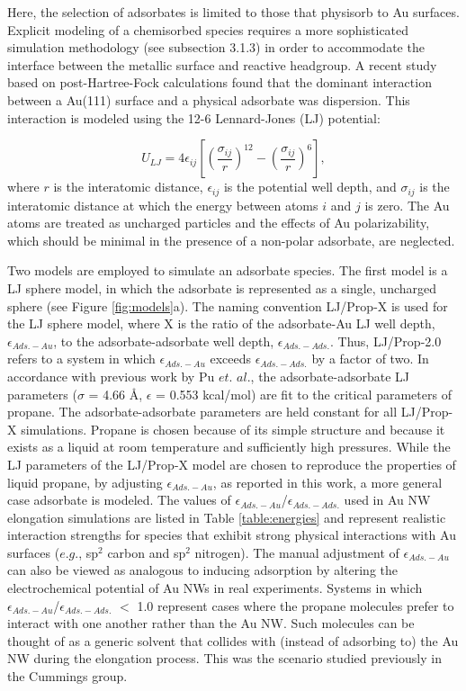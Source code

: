 \documentclass[10pt]{report}  %
\begin{document}
Here, the selection of adsorbates is limited to those that physisorb to Au surfaces.  Explicit modeling of a chemisorbed species requires a more sophisticated simulation methodology \cite{Pu:2010} (see subsection 3.1.3)  in order to accommodate the interface between the metallic surface and reactive headgroup.  A recent study based on post-Hartree-Fock calculations found that the dominant interaction between a Au(111) surface and a physical adsorbate was dispersion.\cite{Piana:2006}  This interaction is modeled using the 12-6 Lennard-Jones (LJ)  potential:  

\begin{equation}U_{LJ} = 4\epsilon_{ij}\left[\left(\frac{\sigma_{ij}}{r}\right)^{12}-\left(\frac{\sigma_{ij}}{r}\right)^{6}\right],\label{ULJ}
\end{equation} where $r$ is the interatomic distance, $\epsilon_{ij}$ is the potential well depth, and $\sigma_{ij}$ is the interatomic distance at which the energy between atoms $i$ and $j$ is zero.  The Au atoms are treated as uncharged particles and the effects of Au polarizability, which should be minimal in the presence of a non-polar adsorbate, are neglected. 

Two models are employed to simulate an adsorbate species.  The first model is a LJ sphere model, in which the adsorbate is represented as a single, uncharged sphere (see Figure \ref{fig:models}a).  The naming convention LJ/Prop-X is used for the LJ sphere model, where X is the ratio of the adsorbate-Au LJ well depth, $\epsilon_{Ads.-Au}$,  to the adsorbate-adsorbate well depth, $\epsilon_{Ads.-Ads.}$.  Thus, LJ/Prop-2.0 refers to a system in which $\epsilon_{Ads.-Au}$ exceeds $\epsilon_{Ads.-Ads.}$ by a factor of two. In accordance with previous work by Pu $et.$ $al.$,\cite{Pu:2007} the adsorbate-adsorbate LJ parameters ($\sigma$ = 4.66 \AA, $\epsilon$ = 0.553 kcal/mol) are fit to the critical parameters of propane.  The adsorbate-adsorbate parameters are held constant for all LJ/Prop-X simulations.  Propane is chosen because of its simple structure and because it exists as a liquid at room temperature and sufficiently high pressures. While the LJ parameters of the LJ/Prop-X model are chosen to reproduce the properties of liquid propane, by adjusting $\epsilon_{Ads.-Au}$, as reported in this work, a more general case adsorbate is modeled. The values of $\epsilon_{Ads.-Au}$/$\epsilon_{Ads.-Ads.}$ used in Au NW elongation simulations are listed in Table \ref{table:energies} and represent realistic interaction strengths for species that exhibit strong physical interactions with Au surfaces ($e.g.$, sp$^2$ carbon and sp$^2$ nitrogen).  The manual adjustment of $\epsilon_{Ads.-Au}$ can also be viewed as analogous to inducing adsorption by altering the electrochemical potential of Au NWs in real experiments. \cite{He:2002}  Systems in which $\epsilon_{Ads.-Au}$/$\epsilon_{Ads.-Ads.}$ $<$ 1.0 represent cases where the propane molecules prefer to interact with one another rather than the Au NW.  Such molecules can be thought of as a generic solvent that collides with (instead of adsorbing to) the Au NW during the elongation process.  This was the scenario studied previously in the Cummings group.\cite{Pu:2007}
\end{document}
